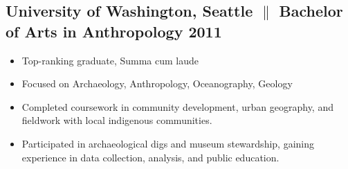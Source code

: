 \documentclass[a4paper,12pt]{article} %
\begin{document}
\subsection{University of Washington, Seattle {$\parallel$}{ Bachelor of Arts
                  in Anthropology} \hfill
      \textbf{2011}}
\begin{itemize}
      \item Top-ranking graduate, Summa cum laude
      \item Focused on Archaeology, Anthropology, Oceanography, Geology
      \item Completed coursework in community development, urban geography, and fieldwork with local indigenous communities.
      \item Participated in archaeological digs and museum stewardship, gaining experience in data collection, analysis, and public education.
\end{itemize}
\end{document}
